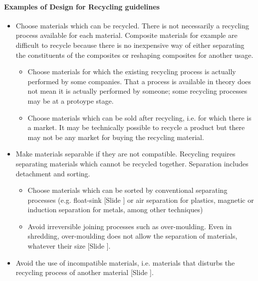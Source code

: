 \documentclass{article}
\newcounter{slide}
\begin{document}
\begin{framed} 
\footnotesize
\paragraph{Examples of Design for Recycling guidelines}
\begin{itemize}
	\item Choose materials which can be recycled. There is not necessarily a recycling process available for each material. Composite materials for example are difficult to recycle because there is no inexpensive way of either separating the constituents of the composites or reshaping composites for another usage. 
	\begin{itemize}
		\item Choose materials for which the existing recycling process is actually performed by some companies. That a process is available in theory does not mean it is actually performed by someone; some recycling processes may be at a protoype stage.
		\item Choose materials which can be sold after recycling, i.e. for which there is a market. It may be technically possible to recycle a product but there may not be any market for buying the recycling material. 
	\end{itemize}
	\item Make materials separable if they are not compatible. Recycling requires separating materials which cannot be recycled together. Separation includes detachment and sorting. 
	\begin{itemize}
		\item Choose materials which can be sorted by conventional separating processes (e.g. float-sink {\color{blue}[Slide ]} or air separation for plastics, magnetic or induction separation for metals, among other techniques)
	  \item Avoid irreversible joining processes such as over-moulding. Even in shredding, over-moulding does not allow the separation of materials, whatever their size {\color{blue}[Slide ]}.
	\end{itemize}
	\item Avoid the use of incompatible materials, i.e. materials that disturbs the recycling process of another material {\color{blue}[Slide ]}.
\end{itemize}
\end{framed}
\end{document}
